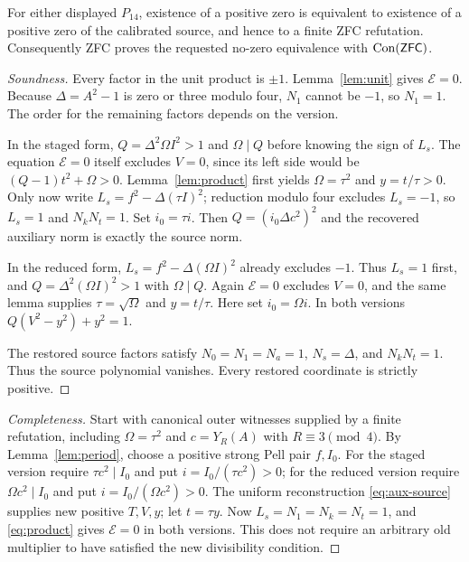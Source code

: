 \begin{theorem}\label{thm:fourteen}
For either displayed $P_{14}$, existence of a positive zero is equivalent to
existence of a positive zero of the calibrated source, and hence to a finite
ZFC refutation. Consequently ZFC proves the requested no-zero equivalence
with $\operatorname{Con}(\mathsf{ZFC})$.
\end{theorem}
\begin{proof}[Soundness]
Every factor in the unit product is $\pm1$.
Lemma~\ref{lem:unit} gives $\mathcal E=0$.
Because $\Delta=A^2-1$ is zero or three modulo four, $N_1$ cannot be $-1$,
so $N_1=1$. The order for the remaining factors depends on the version.

In the staged form, $Q=\Delta^2\Omega I^2>1$ and $\Omega\mid Q$ before
knowing the sign of $L_s$. The equation $\mathcal E=0$ itself excludes
$V=0$, since its left side would be $(Q-1)t^2+\Omega>0$.
Lemma~\ref{lem:product} first yields $\Omega=\tau^2$ and $y=t/\tau>0$.
Only now write $L_s=f^2-\Delta(\tau I)^2$; reduction modulo four excludes
$L_s=-1$, so $L_s=1$ and $N_kN_t=1$.
Set $i_0=\tau i$. Then $Q=(i_0\Delta c^2)^2$ and the recovered auxiliary
norm is exactly the source norm.

In the reduced form, $L_s=f^2-\Delta(\Omega I)^2$ already excludes $-1$.
Thus $L_s=1$ first, and $Q=\Delta^2(\Omega I)^2>1$ with $\Omega\mid Q$.
Again $\mathcal E=0$ excludes $V=0$, and the same lemma supplies
$\tau=\sqrt\Omega$ and $y=t/\tau$. Here set $i_0=\Omega i$.
In both versions $Q(V^2-y^2)+y^2=1$.

The restored source factors satisfy $N_0=N_1=N_a=1$,
$N_s=\Delta$, and $N_kN_t=1$. Thus the source polynomial vanishes.
Every restored coordinate is strictly positive.
\end{proof}
\begin{proof}[Completeness]
Start with canonical outer witnesses supplied by a finite refutation,
including $\Omega=\tau^2$ and $c=Y_R(A)$ with $R\equiv3\pmod4$.
By Lemma~\ref{lem:period}, choose a positive strong Pell pair $f,I_0$.
For the staged version require $\tau c^2\mid I_0$ and put
$i=I_0/(\tau c^2)>0$; for the reduced version require
$\Omega c^2\mid I_0$ and put $i=I_0/(\Omega c^2)>0$.
The uniform reconstruction \eqref{eq:aux-source} supplies new positive
$T,V,y$; let $t=\tau y$. Now $L_s=N_1=N_k=N_t=1$, and
\eqref{eq:product} gives $\mathcal E=0$ in both versions.
This does not require an arbitrary old multiplier to have satisfied the
new divisibility condition.
\end{proof}

